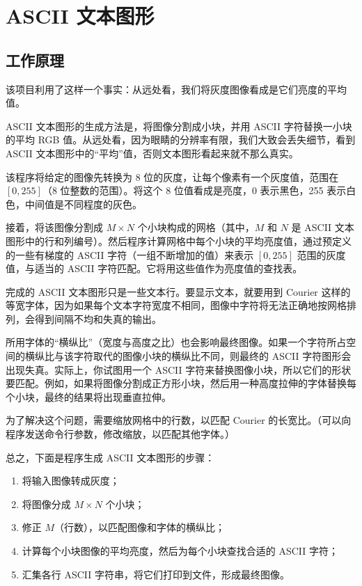 \chapter{ASCII 文本图形\label{ch06}}
\section{工作原理}
该项目利用了这样一个事实：从远处看，我们将灰度图像看成是它们亮度的平均值。

ASCII 文本图形的生成方法是，将图像分割成小块，并用 ASCII 字符替换一小块的平均 RGB 值。从远处看，因为眼睛的分辨率有限，我们大致会丢失细节，看到 ASCII 文本图形中的“平均”值，否则文本图形看起来就不那么真实。

该程序将给定的图像先转换为 8 位的灰度，让每个像素有一个灰度值，范围在 $[0,255]$（8 位整数的范围）。将这个 8 位值看成是亮度，0 表示黑色，255 表示白色，中间值是不同程度的灰色。

接着，将该图像分割成 $M\times N$ 个小块构成的网格（其中，$M$ 和 $N$ 是 ASCII 文本图形中的行和列编号）。然后程序计算网格中每个小块的平均亮度值，通过预定义的一些有梯度的 ASCII 字符（一组不断增加的值）来表示 $[0,255]$ 范围的灰度值，与适当的 ASCII 字符匹配。它将用这些值作为亮度值的查找表。

完成的 ASCII 文本图形只是一些文本行。要显示文本，就要用到 Courier 这样的等宽字体，因为如果每个文本字符宽度不相同，图像中字符将无法正确地按网格排列，会得到间隔不均和失真的输出。

所用字体的“横纵比”（宽度与高度之比）也会影响最终图像。如果一个字符所占空间的横纵比与该字符取代的图像小块的横纵比不同，则最终的 ASCII 字符图形会出现失真。实际上，你试图用一个 ASCII 字符来替换图像小块，所以它们的形状要匹配。例如，如果将图像分割成正方形小块，然后用一种高度拉伸的字体替换每个小块，最终的结果将出现垂直拉伸。

为了解决这个问题，需要缩放网格中的行数，以匹配 Courier 的长宽比。（可以向程序发送命令行参数，修改缩放，以匹配其他字体。）

总之，下面是程序生成 ASCII 文本图形的步骤：
\begin{enumerate}
    \item 将输入图像转成灰度；
    \item 将图像分成 $M\times N$ 个小块；
    \item 修正 $M$（行数），以匹配图像和字体的横纵比；
    \item 计算每个小块图像的平均亮度，然后为每个小块查找合适的 ASCII 字符；
    \item 汇集各行 ASCII 字符串，将它们打印到文件，形成最终图像。
\end{enumerate}